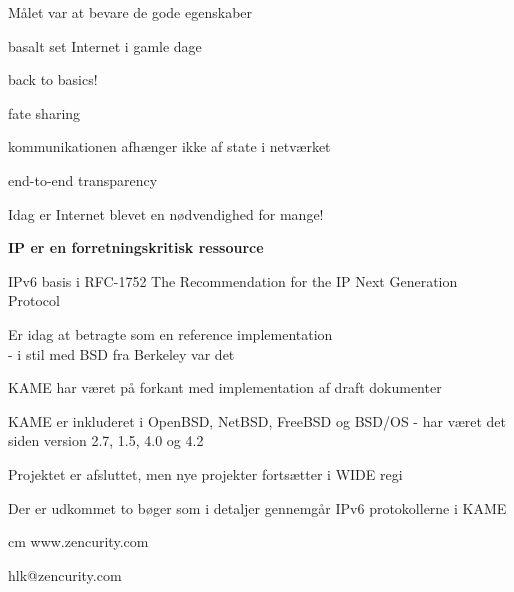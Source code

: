 \documentclass[Screen16to9,17pt]{foils}
\begin{document}

\begin{list1}
\item Målet var at bevare de gode egenskaber
\begin{list2}
\item basalt set Internet i gamle dage
\item back to basics!
\item fate sharing
\item kommunikationen afhænger ikke af state i netværket
\item end-to-end transparency
\end{list2}
\item Idag er Internet blevet en nødvendighed for mange!
\end{list1}

\centerline{\bf IP er en forretningskritisk ressource}

IPv6 basis i RFC-1752 The Recommendation for the IP Next Generation Protocol



\centerline{}

\begin{list2}
\item Er idag at betragte som en reference implementation\\
- i stil med BSD fra Berkeley var det
\item KAME har været på forkant med implementation af draft dokumenter
\item KAME er inkluderet i OpenBSD, NetBSD, FreeBSD og BSD/OS
- har været det siden version 2.7, 1.5, 4.0 og 4.2

\item Projektet er afsluttet, men nye projekter fortsætter i
WIDE regi 
\item Der er udkommet to bøger som i detaljer gennemgår IPv6 protokollerne i KAME
\end{list2}


\begin{center}
\hlkbig
{} cm
www.zencurity.com

hlk@zencurity.com

\end{center}
\end{document}
